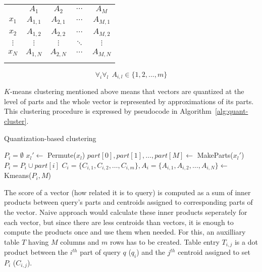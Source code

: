 \begin{center}
\renewcommand{\arraystretch}{1.2}
\begin{tabular}{c|c|c|c|c|}
\multicolumn{1}{r}{} & \multicolumn{1}{c}{$A_{1}$} & \multicolumn{1}{c}{$A_{2}$}
& \multicolumn{1}{c}{$\cdots$} & \multicolumn{1}{c}{$A_{M}$} \\
\hhline{~----}
$x_1$ & $A_{1,1}$ & $A_{2,1}$ & $\cdots$ & $A_{M,1}$ \\
\hhline{~----}
$x_2$ & $A_{1,2}$ & $A_{2,2}$ & $\cdots$ & $A_{M,2}$ \\
\hhline{~----}
$\vdots$ & $\vdots$ & $\vdots$ & $\ddots$ & $\vdots$ \\
\hhline{~----}
$x_N$ & $A_{1,N}$ & $A_{2,N}$ & $\cdots$ & $A_{M,N}$ \\
\hhline{~----}
\end{tabular}
\end{center}

\begin{equation*}
\forall_i \forall_l\ \  A_{i,l} \in \{1,2,...,m\}
\end{equation*}

$K$-means clustering mentioned above means that vectors are quantized at the level of parts
and the whole vector is represented by approximations of its parts.
This clustering procedure is expressed by pseudocode in Algorithm~\ref{alg:quant-cluster}.

\begin{algorithm}
	\caption{Quantization-based clustering}
	\begin{algorithmic}
			\State $P_i = \emptyset$
		\EndFor
			\State $x_l' \gets$ Permute($x_l$)
			\State $part[0], part[1], \dots, part[M] \gets$ MakeParts($x_l'$)
				\State $P_i = P_i \cup part[i]$
			\EndFor
		\EndFor
			\State $C_i = \{C_{i,1}, C_{i,2}, \dots, C_{i,m}\}, A_i = \{A_{i,1}, A_{i,2}, \dots, A_{i,N}\} \gets$ Kmeans($P_i, M$)
		\EndFor
	\end{algorithmic}
\label{alg:quant-cluster}
\end{algorithm}

The score of a vector (how related it is to query) is computed as a sum of inner products
between query's parts and centroids assigned to corresponding parts of the vector.
Naive approach would calculate these inner products seperately for each vector,
but since there are less centroids than vectors, it is enough to compute the products once
and use them when needed.
For this, an auxilliary table $T$ having $M$ columns and $m$ rows has to be created.
Table entry $T_{i,j}$ is a dot product between the $i^{th}$ part of query $q$ ($q_i$) and the $j^{th}$
centroid assigned to set $P_i$ ($C_{i,j}$).

